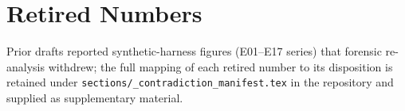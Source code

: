 \documentclass[conference]{IEEEtran}
\begin{document}
{\appendix
\section{Retired Numbers}
Prior drafts reported synthetic-harness figures (E01--E17 series) that forensic re-analysis withdrew; the full mapping of each retired number to its disposition is retained under \texttt{sections/\_contradiction\_manifest.tex} in the repository and supplied as supplementary material.
\vspace{0.1em}
\begingroup
\def\IEEEbibitemsep{-2.5pt plus 0.2pt}
\let\oldthebibliography\thebibliography
\renewcommand\thebibliography[1]{%
  \oldthebibliography{#1}%
  \scriptsize
  \def\baselinestretch{0.75}\selectfont
  \setlength{\parskip}{0pt}%
}


\endgroup
\end{document}

